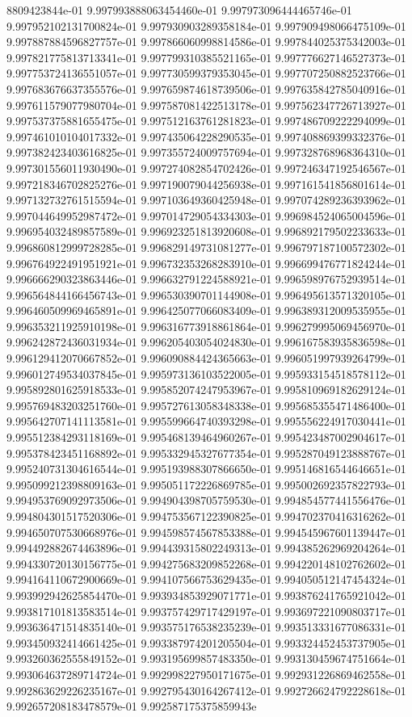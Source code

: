 8809423844e-01	9.997993888063454460e-01	9.997973096444465746e-01	9.997952102131700824e-01	9.997930903289358184e-01	9.997909498066475109e-01	9.997887884596827757e-01	9.997866060998814586e-01	9.997844025375342003e-01	9.997821775813713341e-01	9.997799310385521165e-01	9.997776627146527373e-01	9.997753724136551057e-01	9.997730599379353045e-01	9.997707250882523766e-01	9.997683676637355576e-01	9.997659874618739506e-01	9.997635842785040916e-01	9.997611579077980704e-01	9.997587081422513178e-01	9.997562347726713927e-01	9.997537375881655475e-01	9.997512163761281823e-01	9.997486709222294099e-01	9.997461010104017332e-01	9.997435064228290535e-01	9.997408869399332376e-01	9.997382423403616825e-01	9.997355724009757694e-01	9.997328768968364310e-01	9.997301556011930490e-01	9.997274082854702426e-01	9.997246347192546567e-01	9.997218346702825276e-01	9.997190079044256938e-01	9.997161541856801614e-01	9.997132732761515594e-01	9.997103649360425948e-01	9.997074289236393962e-01	9.997044649952987472e-01	9.997014729054334303e-01	9.996984524065004596e-01	9.996954032489857589e-01	9.996923251813920608e-01	9.996892179502233633e-01	9.996860812999728285e-01	9.996829149731081277e-01	9.996797187100572302e-01	9.996764922491951921e-01	9.996732353268283910e-01	9.996699476771824244e-01	9.996666290323863446e-01	9.996632791224588921e-01	9.996598976752939514e-01	9.996564844166456743e-01	9.996530390701144908e-01	9.996495613571320105e-01	9.996460509969465891e-01	9.996425077066083409e-01	9.996389312009535955e-01	9.996353211925910198e-01	9.996316773918861864e-01	9.996279995069456970e-01	9.996242872436031934e-01	9.996205403054024830e-01	9.996167583935836598e-01	9.996129412070667852e-01	9.996090884424365663e-01	9.996051997939264799e-01	9.996012749534037845e-01	9.995973136103522005e-01	9.995933154518578112e-01	9.995892801625918533e-01	9.995852074247953967e-01	9.995810969182629124e-01	9.995769483203251760e-01	9.995727613058348338e-01	9.995685355471486400e-01	9.995642707141113581e-01	9.995599664740393298e-01	9.995556224917030441e-01	9.995512384293118169e-01	9.995468139464960267e-01	9.995423487002904617e-01	9.995378423451168892e-01	9.995332945327677354e-01	9.995287049123888767e-01	9.995240731304616544e-01	9.995193988307866650e-01	9.995146816544646651e-01	9.995099212398809163e-01	9.995051172226869785e-01	9.995002692357822793e-01	9.994953769092973506e-01	9.994904398705759530e-01	9.994854577441556476e-01	9.994804301517520306e-01	9.994753567122390825e-01	9.994702370416316262e-01	9.994650707530668976e-01	9.994598574567853388e-01	9.994545967601139447e-01	9.994492882674463896e-01	9.994439315802249313e-01	9.994385262969204264e-01	9.994330720130156775e-01	9.994275683209852268e-01	9.994220148102762602e-01	9.994164110672900669e-01	9.994107566753629435e-01	9.994050512147454324e-01	9.993992942625854470e-01	9.993934853929071771e-01	9.993876241765921042e-01	9.993817101813583514e-01	9.993757429717429197e-01	9.993697221090803717e-01	9.993636471514835140e-01	9.993575176538235239e-01	9.993513331677086331e-01	9.993450932414661425e-01	9.993387974201205504e-01	9.993324452453737905e-01	9.993260362555849152e-01	9.993195699857483350e-01	9.993130459674751664e-01	9.993064637289714724e-01	9.992998227950171675e-01	9.992931226869462558e-01	9.992863629226235167e-01	9.992795430164267412e-01	9.992726624792228618e-01	9.992657208183478579e-01	9.992587175375859943e